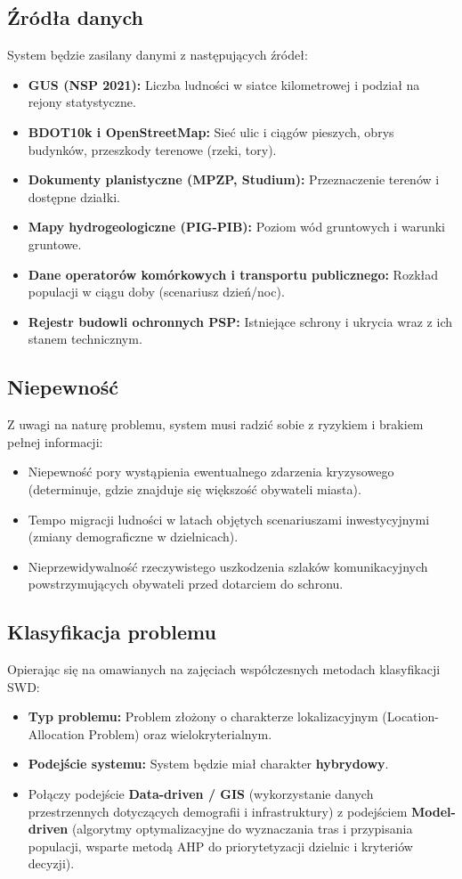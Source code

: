 \documentclass[12pt,a4paper]{article}
\begin{document}
\subsection{Źródła danych}
System będzie zasilany danymi z następujących źródeł:
\begin{itemize}
    \item \textbf{GUS (NSP 2021):} Liczba ludności w siatce kilometrowej i podział na rejony statystyczne.
    \item \textbf{BDOT10k i OpenStreetMap:} Sieć ulic i ciągów pieszych, obrys budynków, przeszkody terenowe (rzeki, tory).
    \item \textbf{Dokumenty planistyczne (MPZP, Studium):} Przeznaczenie terenów i dostępne działki.
    \item \textbf{Mapy hydrogeologiczne (PIG-PIB):} Poziom wód gruntowych i warunki gruntowe.
    \item \textbf{Dane operatorów komórkowych i transportu publicznego:} Rozkład populacji w ciągu doby (scenariusz dzień/noc).
    \item \textbf{Rejestr budowli ochronnych PSP:} Istniejące schrony i ukrycia wraz z ich stanem technicznym.
\end{itemize}

\subsection{Niepewność}
Z uwagi na naturę problemu, system musi radzić sobie z ryzykiem i brakiem pełnej informacji:
\begin{itemize}
    \item Niepewność pory wystąpienia ewentualnego zdarzenia kryzysowego (determinuje, gdzie znajduje się większość obywateli miasta).
    \item Tempo migracji ludności w latach objętych scenariuszami inwestycyjnymi (zmiany demograficzne w dzielnicach).
    \item Nieprzewidywalność rzeczywistego uszkodzenia szlaków komunikacyjnych powstrzymujących obywateli przed dotarciem do schronu.
\end{itemize}

\subsection{Klasyfikacja problemu}
Opierając się na omawianych na zajęciach współczesnych metodach klasyfikacji SWD:
\begin{itemize}
    \item \textbf{Typ problemu:} Problem złożony o charakterze lokalizacyjnym (Location-Allocation Problem) oraz wielokryterialnym.
    \item \textbf{Podejście systemu:} System będzie miał charakter \textbf{hybrydowy}. 
    \item Połączy podejście \textbf{Data-driven / GIS} (wykorzystanie danych przestrzennych dotyczących demografii i infrastruktury) z podejściem \textbf{Model-driven} (algorytmy optymalizacyjne do wyznaczania tras i przypisania populacji, wsparte metodą AHP do priorytetyzacji dzielnic i kryteriów decyzji).
\end{itemize}
\end{document}
